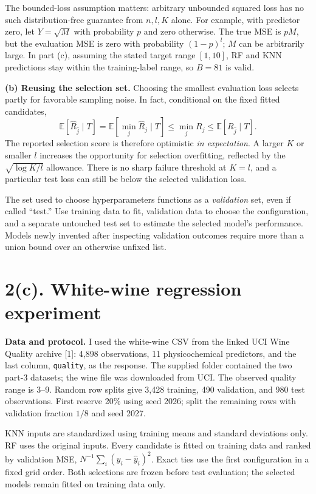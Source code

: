 \documentclass[10pt,letterpaper]{article}
\newcommand{\E}{\mathbb E}
\begin{document}
The bounded-loss assumption matters: arbitrary unbounded squared loss has no such distribution-free guarantee from $n,l,K$ alone. For example, with predictor zero, let $Y=\sqrt M$ with probability $p$ and zero otherwise. The true MSE is $pM$, but the evaluation MSE is zero with probability $(1-p)^l$; $M$ can be arbitrarily large. In part (c), assuming the stated target range $[1,10]$, RF and KNN predictions stay within the training-label range, so $B=81$ is valid.

\textbf{(b) Reusing the selection set.}
Choosing the smallest evaluation loss selects partly for favorable sampling noise. In fact, conditional on the fixed fitted candidates,
\[
\E[\widehat R_{\hat j}\mid T]
=\E[\min_j\widehat R_j\mid T]
\le\min_j R_j
\le\E[R_{\hat j}\mid T].
\]
The reported selection score is therefore optimistic \emph{in expectation}. A larger $K$ or smaller $l$ increases the opportunity for selection overfitting, reflected by the $\sqrt{\log K/l}$ allowance. There is no sharp failure threshold at $K=l$, and a particular test loss can still be below the selected validation loss.

The set used to choose hyperparameters functions as a \emph{validation} set, even if called ``test.'' Use training data to fit, validation data to choose the configuration, and a separate untouched test set to estimate the selected model's performance. Models newly invented after inspecting validation outcomes require more than a union bound over an otherwise unfixed list.

\newpage
\section*{2(c). White-wine regression experiment}
\textbf{Data and protocol.}
I used the white-wine CSV from the linked UCI Wine Quality archive [1]: 4,898 observations, 11 physicochemical predictors, and the last column, \texttt{quality}, as the response. The supplied folder contained the two part-3 datasets; the wine file was downloaded from UCI. The observed quality range is 3--9. Random row splits give 3,428 training, 490 validation, and 980 test observations. First reserve 20\% using seed 2026; split the remaining rows with validation fraction $1/8$ and seed 2027.

KNN inputs are standardized using training means and standard deviations only. RF uses the original inputs. Every candidate is fitted on training data and ranked by validation MSE, $N^{-1}\sum_i(y_i-\hat y_i)^2$. Exact ties use the first configuration in a fixed grid order. Both selections are frozen before test evaluation; the selected models remain fitted on training data only.
\end{document}
